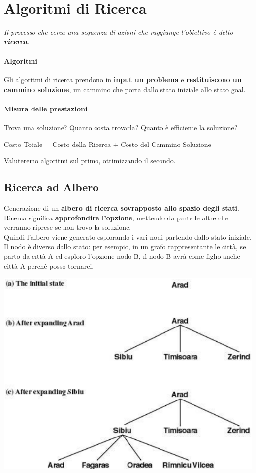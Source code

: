 \documentclass[10pt]{book}
\begin{document}
\section{Algoritmi di Ricerca}
\textit{Il processo che cerca una sequenza di azioni che raggiunge l'obiettivo è detto \textbf{ricerca}}.
\paragraph{Algoritmi} Gli algoritmi di ricerca prendono in \textbf{input un problema} e \textbf{restituiscono un cammino soluzione}, un cammino che porta dallo stato iniziale allo stato goal.
\paragraph{Misura delle prestazioni} Trova una soluzione? Quanto costa trovarla? Quanto è efficiente la soluzione?
\begin{center}
Costo Totale = Costo della Ricerca $+$ Costo del Cammino Soluzione
\end{center}
Valuteremo algoritmi sul primo, ottimizzando il secondo.
\subsection{Ricerca ad Albero}
Generazione di un \textbf{albero di ricerca sovrapposto allo spazio degli stati}. Ricerca significa \textbf{approfondire l'opzione}, mettendo da parte le altre che verranno riprese se non trovo la soluzione.\\
Quindi l'albero viene generato esplorando i vari nodi partendo dallo stato iniziale. Il nodo è diverso dallo stato: per esempio, in un grafo rappresentante le città, se parto da città A ed esploro l'opzione nodo B, il nodo B avrà come figlio anche città A perché posso tornarci.
\begin{center}
	\includegraphics[scale=0.7]{ricercaalbero.png}
\end{center}
\end{document}

